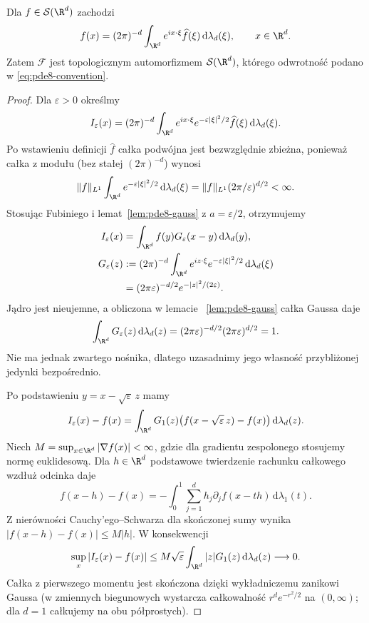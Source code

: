 \begin{twierdzenie}
\label{thm:pde8-inversion}
Dla $f\in\mathcal S(\R^d)$ zachodzi
\[
 f(x)=(2\pi)^{-d}\int_{\R^d}e^{ix\cdot\xi}
 \widehat f(\xi)\,\mathrm d\lambda_d(\xi),
 \qquad x\in\R^d.
\]
Zatem $\mathcal F$ jest topologicznym automorfizmem
$\mathcal S(\R^d)$, którego odwrotność podano w
\eqref{eq:pde8-convention}.
\end{twierdzenie}
\begin{proof}
Dla $\varepsilon>0$ określmy
\[
 I_\varepsilon(x)=(2\pi)^{-d}\int_{\R^d}
 e^{ix\cdot\xi}e^{-\varepsilon|\xi|^2/2}
 \widehat f(\xi)\,\mathrm d\lambda_d(\xi).
\]
Po wstawieniu definicji $\widehat f$ całka
podwójna jest bezwzględnie zbieżna, ponieważ
całka z modułu (bez stałej $(2\pi)^{-d}$) wynosi
\[
 \|f\|_{L^1}
 \int_{\R^d}e^{-\varepsilon|\xi|^2/2}
 \,\mathrm d\lambda_d(\xi)
 =\|f\|_{L^1}(2\pi/\varepsilon)^{d/2}<\infty.
\]
Stosując Fubiniego i lemat~\ref{lem:pde8-gauss}
z $a=\varepsilon/2$, otrzymujemy
\[
 \begin{aligned}
 I_\varepsilon(x)
 &=\int_{\R^d}f(y)G_\varepsilon(x-y)
 \,\mathrm d\lambda_d(y),\\
 G_\varepsilon(z)
 &:=(2\pi)^{-d}\int_{\R^d}e^{iz\cdot\xi}
 e^{-\varepsilon|\xi|^2/2}\,\mathrm d\lambda_d(\xi)\\
 &=(2\pi\varepsilon)^{-d/2}
 e^{-|z|^2/(2\varepsilon)}.
 \end{aligned}
\]
Jądro jest nieujemne, a obliczona w lemacie
~\ref{lem:pde8-gauss} całka Gaussa daje
\[
 \int_{\R^d}G_\varepsilon(z)\,\mathrm d\lambda_d(z)
 =(2\pi\varepsilon)^{-d/2}(2\pi\varepsilon)^{d/2}=1.
\] Nie ma jednak zwartego
nośnika, dlatego uzasadnimy jego własność
przybliżonej jedynki bezpośrednio.

Po podstawieniu $y=x-\sqrt\varepsilon\,z$ mamy
\[
 I_\varepsilon(x)-f(x)
 =\int_{\R^d}G_1(z)
 \bigl(f(x-\sqrt\varepsilon\,z)-f(x)\bigr)
 \,\mathrm d\lambda_d(z).
\]
Niech $M=\sup_{x\in\R^d}|\nabla f(x)|<\infty$,
gdzie dla gradientu zespolonego stosujemy
normę euklidesową. Dla $h\in\R^d$ podstawowe twierdzenie
rachunku całkowego wzdłuż odcinka daje
\[
 f(x-h)-f(x)
 =-\int_0^1\sum_{j=1}^d h_j\partial_j f(x-th)
 \,\mathrm d\lambda_1(t).
\]
Z nierówności Cauchy'ego--Schwarza dla
skończonej sumy wynika
$|f(x-h)-f(x)|\le M|h|$.
W konsekwencji
\[
 \sup_x|I_\varepsilon(x)-f(x)|
 \le M\sqrt\varepsilon
 \int_{\R^d}|z|G_1(z)\,\mathrm d\lambda_d(z)
 \longrightarrow0.
\]
Całka z pierwszego momentu jest skończona
dzięki wykładniczemu zanikowi Gaussa
(w zmiennych biegunowych wystarcza całkowalność
$r^d e^{-r^2/2}$ na $(0,\infty)$; dla $d=1$
całkujemy na obu półprostych).


\end{proof}
